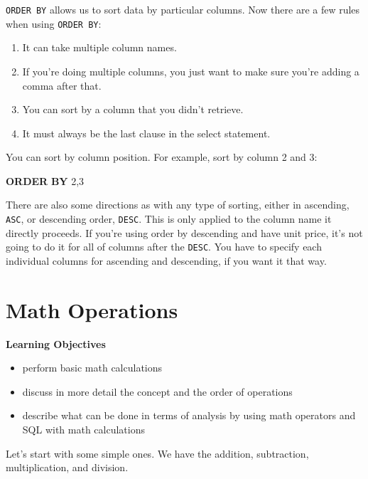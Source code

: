 \documentclass[]{book}
\makeatletter
\newenvironment{Shaded}{\begin{snugshade}}{\end{snugshade}}
\newcommand{\KeywordTok}[1]{\textcolor[rgb]{0.13,0.29,0.53}{\textbf{{#1}}}}
\newcommand{\DecValTok}[1]{\textcolor[rgb]{0.00,0.00,0.81}{{#1}}}
\newcommand{\NormalTok}[1]{{#1}}
\providecommand{\tightlist}{%
  \setlength{\itemsep}{0pt}\setlength{\parskip}{0pt}}
\newenvironment{kframe}{%
\medskip{}
\setlength{\fboxsep}{.8em}
 \def\at@end@of@kframe{}%
 \ifinner\ifhmode%
  \def\at@end@of@kframe{\end{minipage}}%
  \begin{minipage}{\columnwidth}%
 \fi\fi%
 \def\FrameCommand##1{\hskip\@totalleftmargin \hskip-\fboxsep
 \colorbox{shadecolor}{##1}\hskip-\fboxsep
     \hskip-\linewidth \hskip-\@totalleftmargin \hskip\columnwidth}%
 \MakeFramed {\advance\hsize-\width
   \@totalleftmargin\z@ \linewidth\hsize
   \@setminipage}}%
 {\par\unskip\endMakeFramed%
 \at@end@of@kframe}
\renewenvironment{Shaded}{\begin{kframe}}{\end{kframe}}
\theoremstyle{definition}
\theoremstyle{definition}
\theoremstyle{remark}
\makeatother
\begin{document}
\texttt{ORDER\ BY} allows us to sort data by particular columns. Now
there are a few rules when using \texttt{ORDER\ BY}:

\begin{enumerate}
\def\labelenumi{\arabic{enumi}.}
\tightlist
\item
  It can take multiple column names.
\item
  If you're doing multiple columns, you just want to make sure you're
  adding a comma after that.
\item
  You can sort by a column that you didn't retrieve.
\item
  It must always be the last clause in the select statement.
\end{enumerate}

You can sort by column position. For example, sort by column 2 and 3:

\begin{Shaded}
\begin{Highlighting}[]
\KeywordTok{ORDER} \KeywordTok{BY} \DecValTok{2}\NormalTok{,}\DecValTok{3}
\end{Highlighting}
\end{Shaded}

There are also some directions as with any type of sorting, either in
ascending, \texttt{ASC}, or descending order, \texttt{DESC}. This is
only applied to the column name it directly proceeds. If you're using
order by descending and have unit price, it's not going to do it for all
of columns after the \texttt{DESC}. You have to specify each individual
columns for ascending and descending, if you want it that way.

\section{Math Operations}\label{math-operations}

\textbf{Learning Objectives}

\begin{itemize}
\tightlist
\item
  perform basic math calculations
\item
  discuss in more detail the concept and the order of operations
\item
  describe what can be done in terms of analysis by using math operators
  and SQL with math calculations
\end{itemize}

Let's start with some simple ones. We have the addition, subtraction,
multiplication, and division.
\end{document}
